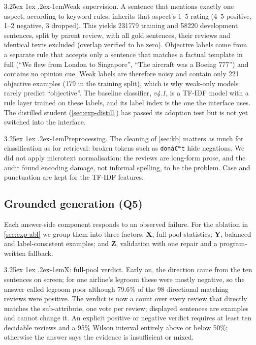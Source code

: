 \documentclass[10pt,twocolumn,a4paper]{article}
\makeatletter
\renewcommand\paragraph{\@startsection{paragraph}{4}{\parindent}%
  {3.25ex \@plus 1ex \@minus .2ex}{-1em}{\normalfont\normalsize\bfseries}}
\makeatother
\begin{document}
\paragraph{Weak supervision.} A sentence that mentions exactly one aspect, according to keyword rules, inherits that
aspect's 1--5 rating (4--5 positive, 1--2 negative, 3 dropped). This yields \num{231779} training and \num{58220}
development sentences, split by parent review, with all gold sentences, their reviews and identical texts excluded
(overlap verified to be zero). Objective labels come from a separate rule that accepts only a sentence that matches a
factual template in full (``We flew from London to Singapore'', ``The aircraft was a Boeing 777'') and contains no
opinion cue. Weak labels are therefore noisy and contain only 221 objective examples (179 in the training split), which
is why weak-only models rarely predict ``objective''. The baseline classifier, \emph{v4.1}, is a TF-IDF model with a
rule layer trained on these labels, and its label index is the one the interface uses. The distilled student
(\cref{sec:exp-distill}) has passed its adoption test but is not yet switched into the interface.

\paragraph{Preprocessing.} The cleaning of \cref{sec:kb} matters as much for classification as for retrieval: broken
tokens such as \texttt{donâ€™t} hide negations. We did not apply microtext normalisation: the reviews are long-form
prose, and the audit found encoding damage, not informal spelling, to be the problem. Case and punctuation are kept
for the TF-IDF features.

\subsection{Grounded generation (Q5)}
\label{sec:gen}

Each answer-side component responds to an observed failure. For the ablation in \cref{sec:exp-abl} we group them
into three factors: \textbf{X}, full-pool statistics; \textbf{Y}, balanced and label-consistent examples; and
\textbf{Z}, validation with one repair and a program-written fallback.

\paragraph{X: full-pool verdict.} Early on, the direction came from the ten sentences on screen; for one airline's legroom
these were mostly negative, so the answer called legroom poor although 79.6\% of the 98 directional matching reviews
were positive. The verdict is now a count over every review that directly matches the sub-attribute, one vote per
review; displayed sentences are examples and cannot change it. An explicit positive or negative verdict requires at
least ten decidable reviews and a 95\% Wilson interval entirely above or below 50\%; otherwise the answer says the
evidence is insufficient or mixed.
\end{document}
